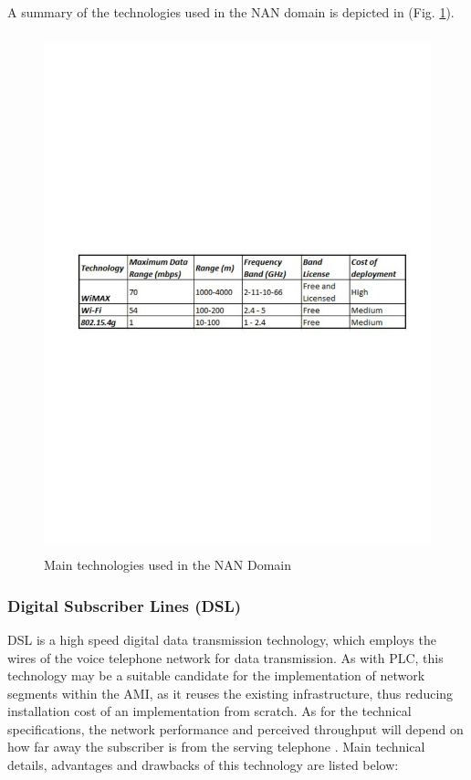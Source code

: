 \documentclass[11pt,draftclsnofoot,onecolumn]{IEEEtran}
\begin{document}
A summary of the technologies used in the NAN domain is depicted in (Fig. \ref{fig:nan}).

\begin{figure}[h!]
\centering
\includegraphics [height=15cm] {NANTechnologiesv3}
\caption{Main technologies used in the NAN Domain}
\label{fig:nan}
\end{figure}


\subsubsection{Digital Subscriber Lines (DSL)}\label{dsl}
DSL is a high speed digital data transmission technology, which employs the wires of the voice telephone network for data transmission. As with PLC, this technology may be a suitable candidate for the implementation of network segments within the AMI, as it reuses the existing infrastructure, thus reducing installation cost of an implementation from scratch. As for the technical specifications, the network performance and perceived throughput will depend on how far away the subscriber is from the serving telephone  \cite{Gungor2011}. Main technical details, advantages and drawbacks of this technology are listed below:
\end{document}
